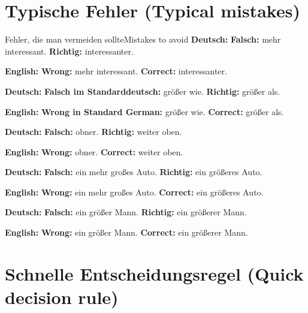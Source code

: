 \documentclass[a4paper,11pt]{article}
\newcommand{\GermanText}[1]{\textbf{Deutsch: }#1\par}
\newcommand{\EnglishText}[1]{{\small\color{SoftGray}\textbf{English: }#1\par}}
\begin{document}
   \section{Typische Fehler \textnormal{(Typical mistakes)}}

      \begin{grammarentry}{Fehler, die man vermeiden sollte}{Mistakes to avoid}
         \GermanText{\textbf{Falsch:} mehr interessant. \quad \textbf{Richtig:} interessanter.}
         \EnglishText{\textbf{Wrong:} mehr interessant. \quad \textbf{Correct:} interessanter.}

         \GermanText{\textbf{Falsch im Standarddeutsch:} größer wie. \quad \textbf{Richtig:} größer als.}
         \EnglishText{\textbf{Wrong in Standard German:} größer wie. \quad \textbf{Correct:} größer als.}

         \GermanText{\textbf{Falsch:} obner. \quad \textbf{Richtig:} weiter oben.}
         \EnglishText{\textbf{Wrong:} obner. \quad \textbf{Correct:} weiter oben.}

         \GermanText{\textbf{Falsch:} ein mehr großes Auto. \quad \textbf{Richtig:} ein größeres Auto.}
         \EnglishText{\textbf{Wrong:} ein mehr großes Auto. \quad \textbf{Correct:} ein größeres Auto.}

         \GermanText{\textbf{Falsch:} ein größer Mann. \quad \textbf{Richtig:} ein größerer Mann.}
         \EnglishText{\textbf{Wrong:} ein größer Mann. \quad \textbf{Correct:} ein größerer Mann.}
      \end{grammarentry}

   \section{Schnelle Entscheidungsregel \textnormal{(Quick decision rule)}}
\end{document}
